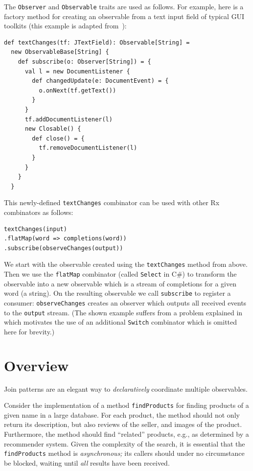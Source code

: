 \documentclass[runningheads]{llncs}
\begin{document}
\begin{sloppypar}
The \verb|Observer| and \verb|Observable| traits are used as follows. For
example, here is a factory method for creating an observable from a text input
field of typical GUI toolkits (this example is adapted from~\cite{RxCACM}):

\lstset{numbers=none,xleftmargin=0em}
\begin{lstlisting}
def textChanges(tf: JTextField): Observable[String] =
  new ObservableBase[String] {
    def subscribe(o: Observer[String]) = {
      val l = new DocumentListener {
        def changedUpdate(e: DocumentEvent) = {
          o.onNext(tf.getText())
        }
      }
      tf.addDocumentListener(l)
      new Closable() {
        def close() = {
          tf.removeDocumentListener(l)
        }
      }
    }
  }
\end{lstlisting}

This newly-defined \verb|textChanges| combinator can be used with other Rx
combinators as follows:

\begin{lstlisting}
textChanges(input)
.flatMap(word => completions(word))
.subscribe(observeChanges(output))
\end{lstlisting}

We start with the observable created using the \verb|textChanges| method from
above. Then we use the \verb|flatMap| combinator (called \verb|Select| in C\#)
to transform the observable into a new observable which is a stream of
completions for a given word (a string). On the resulting observable we call
\verb|subscribe| to register a consumer: \verb|observeChanges| creates an
observer which outputs all received events to the \verb|output| stream. (The
shown example suffers from a problem explained in~\cite{RxCACM} which
motivates the use of an additional \verb|Switch| combinator which is omitted
here for brevity.)


\section{Overview}\label{sec:overview}

Join patterns are an elegant way to {\em declaratively} coordinate multiple
observables.

Consider the implementation of a method \verb|findProducts| for finding
products of a given name in a large database. For each product, the method
should not only return its description, but also reviews of the seller, and
images of the product. Furthermore, the method should find ``related''
products, e.g., as determined by a recommender system. Given the complexity of
the search, it is essential that the \verb|findProducts| method is {\em
asynchronous;} its callers should under no circumstance be blocked, waiting
until {\em all} results have been received.


\end{sloppypar}
\end{document}
